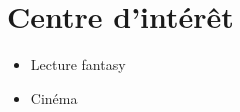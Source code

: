 \documentclass[letterpaper]{twentysecondcv} %
\begin{document}

\section{Centre d'intérêt}

\begin{itemize}
    \item Lecture fantasy
    \item Cinéma
\end{itemize}









\end{document}
